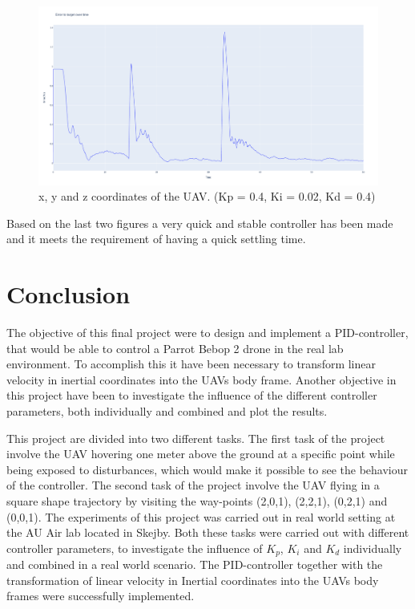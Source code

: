\documentclass[conference]{IEEEtran}
\begin{document}
\begin{figure}[hbtp]
	\centering
	\includegraphics[width=1.0\linewidth]{images/task1_9_err.png}
	\caption{x, y and z coordinates of the UAV. (Kp = 0.4, Ki = 0.02, Kd = 0.4)}
	\label{fig:task1_9_err}
\end{figure}

Based on the last two figures a very quick and stable controller has been made and it meets the requirement of having a quick settling time.

\section{Conclusion}
The objective of this final project were to design and implement a PID-controller, that would be able to control a Parrot Bebop 2 drone in the real lab environment. To accomplish this it have been necessary to transform linear velocity in inertial coordinates into the UAVs body frame. Another objective in this project have been to investigate the influence of the different controller parameters, both individually and combined and plot the results. 

This project are divided into two different tasks. The first task of the project involve the UAV hovering one meter above the ground at a specific point while being exposed to disturbances, which would make it possible to see the behaviour of the controller. The second task of the project involve the UAV flying in a square shape trajectory by visiting the way-points (2,0,1), (2,2,1), (0,2,1) and (0,0,1). The experiments of this project was carried out in real world setting at the AU Air lab located in Skejby. Both these tasks were carried out with different controller parameters, to investigate the influence of $K_p$, $K_i$ and $K_d$ individually and combined in a real world scenario. The PID-controller together with the transformation of linear velocity in Inertial coordinates into the UAVs body frames were successfully implemented.
\end{document}
